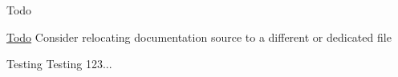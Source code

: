 \begin{DoxyRefDesc}{Todo}
\item[\hyperlink{todo__todo000001}{Todo}]Consider relocating documentation source to a different or dedicated file\end{DoxyRefDesc}


Testing Testing 123... 
